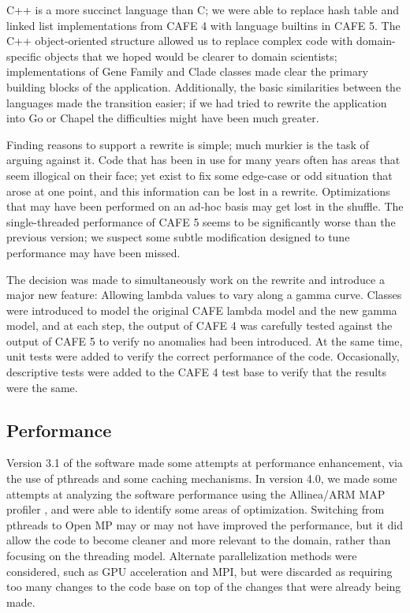 \documentclass[acmtog, authorversion]{acmart}
\begin{document}
    C++ is a more succinct language than C; we were able to replace hash table and linked list implementations from CAFE 4 with language builtins in CAFE 5. The C++ object-oriented structure allowed us to replace complex code with domain-specific objects that we hoped would be clearer to domain scientists; implementations of Gene Family and Clade classes made clear the primary building blocks of the application. Additionally, the basic similarities between the languages made the transition easier; if we had tried to rewrite the application into Go or Chapel the difficulties might have been much greater.
    
    Finding reasons to support a rewrite is simple; much murkier is the task of arguing against it. Code that has been in use for many years often has areas that seem illogical on their face; yet exist to fix some edge-case or odd situation that arose at one point, and this information can be lost in a rewrite. Optimizations that may have been performed on an ad-hoc basis may get lost in the shuffle. The single-threaded performance of CAFE 5 seems to be significantly worse than the previous version; we suspect some subtle modification designed to tune performance may have been missed.
    
    The decision was made to simultaneously work on the rewrite and introduce a major new feature: Allowing lambda values to vary along a gamma curve. Classes were introduced to model the original CAFE lambda model and the new gamma model, and at each step, the output of CAFE 4 was carefully tested against the output of CAFE 5 to verify no anomalies had been introduced. At the same time, unit tests were added to verify the correct performance of the code. Occasionally, descriptive tests were added to the CAFE 4 test base to verify that the results were the same.
    
\subsection{Performance}

    

Version 3.1 of the software made some attempts at performance enhancement, via the use of pthreads and some caching mechanisms. In version 4.0, we made some attempts at analyzing the software performance using the Allinea/ARM MAP profiler , and were able to identify some areas of optimization. Switching from pthreads to Open MP may or may not have improved the performance, but it did allow the code to become cleaner and more relevant to the domain, rather than focusing on the threading model. Alternate parallelization methods were considered, such as GPU acceleration and MPI, but were discarded as requiring too many changes to the code base on top of the changes that were already being made.
\end{document}
